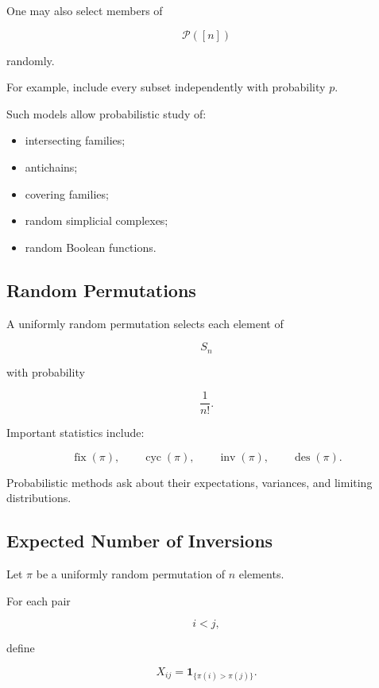 One may also select members of

\[
\mathcal{P}([n])
\]

randomly.

For example, include every subset independently with probability \(p\).

Such models allow probabilistic study of:

\begin{itemize}
    \item intersecting families;
    \item antichains;
    \item covering families;
    \item random simplicial complexes;
    \item random Boolean functions.
\end{itemize}

\subsection{Random Permutations}
\label{subsec:random-permutations}

A uniformly random permutation selects each element of

\[
S_n
\]

with probability

\[
\frac1{n!}.
\]

Important statistics include:

\[
\operatorname{fix}(\pi),
\qquad
\operatorname{cyc}(\pi),
\qquad
\operatorname{inv}(\pi),
\qquad
\operatorname{des}(\pi).
\]

Probabilistic methods ask about their expectations, variances, and
limiting distributions.

\subsection{Expected Number of Inversions}
\label{subsec:expected-inversions}

Let \(\pi\) be a uniformly random permutation of \(n\) elements.

For each pair

\[
i<j,
\]

define

\[
X_{ij}
=
\mathbf{1}_{\{\pi(i)>\pi(j)\}}.
\]

